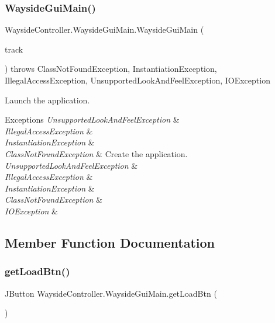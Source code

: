 \subsubsection{\texorpdfstring{Wayside\+Gui\+Main()}{WaysideGuiMain()}}
{\footnotesize\ttfamily Wayside\+Controller.\+Wayside\+Gui\+Main.\+Wayside\+Gui\+Main (\begin{DoxyParamCaption}\item[{\hyperlink{classTrackModel_1_1TrackModel}{Track\+Model}}]{track }\end{DoxyParamCaption}) throws Class\+Not\+Found\+Exception, Instantiation\+Exception, Illegal\+Access\+Exception, Unsupported\+Look\+And\+Feel\+Exception, I\+O\+Exception}



Launch the application. 


\begin{DoxyExceptions}{Exceptions}
{\em Unsupported\+Look\+And\+Feel\+Exception} & \\
\hline
{\em Illegal\+Access\+Exception} & \\
\hline
{\em Instantiation\+Exception} & \\
\hline
{\em Class\+Not\+Found\+Exception} & Create the application. \\
\hline
{\em Unsupported\+Look\+And\+Feel\+Exception} & \\
\hline
{\em Illegal\+Access\+Exception} & \\
\hline
{\em Instantiation\+Exception} & \\
\hline
{\em Class\+Not\+Found\+Exception} & \\
\hline
{\em I\+O\+Exception} & \\
\hline
\end{DoxyExceptions}


\subsection{Member Function Documentation}
\mbox{\label{classWaysideController_1_1WaysideGuiMain_abdc61ffc03ce5e58bfa37142c1935677}} 
\subsubsection{\texorpdfstring{get\+Load\+Btn()}{getLoadBtn()}}
{\footnotesize\ttfamily J\+Button Wayside\+Controller.\+Wayside\+Gui\+Main.\+get\+Load\+Btn (\begin{DoxyParamCaption}{ }\end{DoxyParamCaption})}

